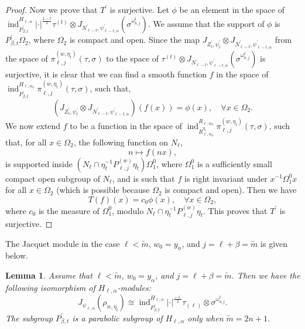 \documentclass[12pt]{amsart}
\newcommand{\ind}{\operatorname{ind}}
\newcommand{\wt}{\widetilde}
\newtheorem{lemma}[theorem]{Lemma}
\theoremstyle{remark}
\begin{document}
\begin{proof}
Now we prove that $T^\prime$ is surjective. Let $\phi$ be an element in the space of $\ind_{P^\prime_{\beta,t}}^{H_{\ell,\alpha}} |\cdot|^{\frac{1-t}{2}} \tau^{(t)} \otimes J_{N_{\ell-t}^\prime, \psi_{\ell-t,\alpha} ^\prime}(\sigma^{\omega_{b,j}^t})$. We assume that the support of $\phi$ is $P^\prime_{\beta,t}\Omega_2$, where $\Omega_2$ is compact and open. Since the map $J_{Z_t^\prime,\psi_t^\prime}\otimes J_{N_{\ell-t}^\prime, \psi_{\ell-t,\alpha} ^\prime} $ from the space of  $\pi_{\ell,j}^{(w,\eta_t)}(\tau,\sigma)$ to the space of $\tau^{(t)}\otimes J_{N_{\ell-t}^\prime, \psi_{\ell-t,\alpha} ^\prime} (\sigma^{\omega_{b,j}^t} )$ is surjective, it is clear that we can find a smooth function $f$ in the space of $\ind_{P^\prime_{\beta,t}}^{H_{\ell,w_0}} \pi_{\ell,j}^{(w,\eta_t)}(\tau,\sigma)$, such that, 
\begin{equation*}
	\left( J_{Z_t^\prime,\psi_t^\prime}\otimes J_{N_{\ell-t}^\prime, \psi_{\ell-t,\alpha} ^\prime} \right)(f(x))=\phi(x), \quad \forall x\in \Omega_2. 
\end{equation*}
We now extend $f$ to be a function in the space of $\ind_{R_{\ell,w_0}^{\eta_t}}^{R_{\ell,w_0}} \pi_{\ell,j}^{(w,\eta_t)}(\tau,\sigma)$, such that, for all $x\in \Omega_2$, the following function on $N_{\ell}$, 
\begin{equation*}
n\mapsto f(nx),	
\end{equation*}
is supported inside $(N_{\ell}\cap \eta_t^{-1} P_{\ell,j}^{(w)} \eta_t)\Omega_1^0$, where $\Omega_1^0$ is a sufficiently small compact open subgroup of $N_{\ell}$, and is such that $f$ is right invariant under $x^{-1}\Omega_1^0 x$ for all $x\in \Omega_2$ (which is possible because $\Omega_2$ is compact and open). Then we have
\begin{equation*}
T(f)(x)=c_0 \phi(x), \quad \forall x\in \Omega_2,	
\end{equation*}
where $c_0$ is the measure of $\Omega_1^0$, modulo $N_{\ell}\cap \eta_t^{-1}P_{\ell,j}^{(w)} \eta_t$. This proves that $T^\prime$ is surjective. 
\end{proof}




The Jacquet module in the case $\ell<\wt m$, $w_0=y_\alpha$, and $j=\ell+\beta=\wt m$ is given below. 
\begin{lemma}
\label{lemma-JacquetModule-lemma2}
Assume that $\ell<\wt m$, $w_0=y_\alpha$, and $j=\ell+\beta=\wt m$. Then we have the following isomorphism of $H_{\ell,\alpha}$-modules:
\begin{equation*}
	J_{\psi_{\ell,\alpha}}(	\rho_{w,\eta_{t}} ) \cong  \ind_{P^\prime_{\beta,t}}^{H_{\ell,\alpha}} |\cdot|^{\frac{-\ell}{2}} \tau_{(\ell)} \otimes  \sigma^{\omega_{b,j}^t}.
\end{equation*}
The subgroup $P^\prime_{\beta,t}$ is a parabolic subgroup of $H_{\ell,\alpha}$ only when $\wt m=2n+1$.
\end{lemma}
\end{document}
